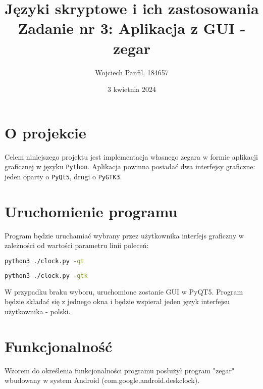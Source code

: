 \documentclass[11pt]{article}
\title{
	\textbf{Języki skryptowe i ich zastosowania}\\
	Zadanie nr 3: Aplikacja z GUI - zegar}
\author{Wojciech Panfil, 184657}
\date{3 kwietnia 2024}
\begin{document}
	\maketitle
	
    \section{O projekcie}
	\justify
	Celem niniejszego projektu jest implementacja własnego zegara w formie
    aplikacji graficznej w języku \texttt{Python}. Aplikacja powinna posiadać
    dwa interfejsy graficzne: jeden oparty o \texttt{PyQt5}, drugi o \texttt{PyGTK3}.

    \section{Uruchomienie programu}
    Program będzie uruchamiać wybrany przez użytkownika interfejs graficzny w zależności
    od wartości parametru linii poleceń:
    \begin{lstlisting}[language=bash, caption={uruchomienie GUI w PyQT5},captionpos=b]
    python3 ./clock.py -qt
    \end{lstlisting}
    \begin{lstlisting}[language=bash, caption={uruchomienie GUI w PyGTK3},captionpos=b]
    python3 ./clock.py -gtk
    \end{lstlisting}
    W przypadku braku wyboru, uruchomione zostanie GUI w PyQT5.
    Program będzie składać się z jednego okna i będzie wspierał jeden język interfejsu użytkownika - polski.

    \section{Funkcjonalność}
    Wzorem do określenia funkcjonalności programu posłużył program "zegar" wbudowany
    w system Android (com.google.android.deskclock).
\end{document}
